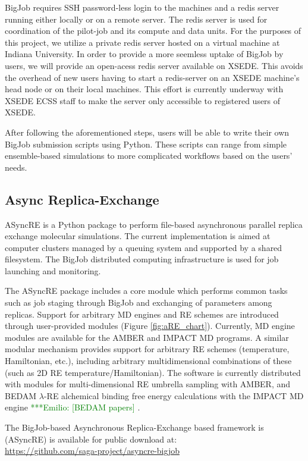\documentclass{sig-alternate}
\newcommand{\egnote}[1]{ {\textcolor{green} { ***Emilio: #1 }}}
\newcommand{\egnote}[1]{ {}}
\begin{document}
BigJob requires SSH password-less login to the machines and a redis
server running either locally or on a remote server. The redis server
is used for coordination of the pilot-job and its compute and data
units. For the purposes of this project, we utilize a private redis
server hosted on a virtual machine at Indiana University. In order to
provide a more seemless uptake of BigJob by users, we will provide an
open-acess redis server available on XSEDE. This avoids the overhead
of new users having to start a redis-server on an XSEDE machine's head
node or on their local machines. This effort is currently underway
with XSEDE ECSS staff to make the server only accessible to registered
users of XSEDE.

After following the aforementioned steps, users will be able to write
their own BigJob submission scripts using Python. These scripts can
range from simple ensemble-based simulations to more complicated
workflows based on the users' needs.

\subsection{Async Replica-Exchange}

ASyncRE is a Python package to perform file-based asynchronous
parallel replica exchange molecular simulations. The current
implementation is aimed at computer clusters managed by a queuing
system and supported by a shared filesystem. The BigJob distributed
computing infrastructure is used for job launching and monitoring.

The ASyncRE package includes a core module which performs common tasks
such as job staging through BigJob and exchanging of parameters among
replicas. Support for arbitrary MD engines and RE schemes are
introduced through user-provided modules (Figure \ref{fig:aRE_chart}). Currently, MD
engine modules are available for the AMBER and IMPACT MD programs. A
similar modular mechanism provides support for arbitrary RE schemes
(temperature, Hamiltonian, etc.), including arbitrary multidimensional
combinations of these (such as 2D RE temperature/Hamiltonian). The
software is currently distributed with modules for multi-dimensional RE
umbrella sampling with AMBER\cite{AMBER12}, and BEDAM $\lambda$-RE alchemical binding
free energy calculations with the IMPACT MD engine \egnote{[BEDAM papers]}.

The BigJob-based Asynchronous Replica-Exchange based framework is (ASyncRE) is available for public download at: \\
\url{https://github.com/saga-project/asyncre-bigjob}
\end{document}
